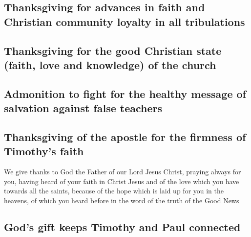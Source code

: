 \hypertarget{thanksgiving-for-advances-in-faith-and-christian-community-loyalty-in-all-tribulations}{%
\subsection{Thanksgiving for advances in faith and Christian community
loyalty in all
tribulations}\label{thanksgiving-for-advances-in-faith-and-christian-community-loyalty-in-all-tribulations}}

\hypertarget{thanksgiving-for-the-good-christian-state-faith-love-and-knowledge-of-the-church}{%
\subsection{Thanksgiving for the good Christian state (faith, love and
knowledge) of the
church}\label{thanksgiving-for-the-good-christian-state-faith-love-and-knowledge-of-the-church}}

\hypertarget{admonition-to-fight-for-the-healthy-message-of-salvation-against-false-teachers}{%
\subsection{Admonition to fight for the healthy message of salvation
against false
teachers}\label{admonition-to-fight-for-the-healthy-message-of-salvation-against-false-teachers}}

\hypertarget{thanksgiving-of-the-apostle-for-the-firmness-of-timothys-faith}{%
\subsection{Thanksgiving of the apostle for the firmness of Timothy's
faith}\label{thanksgiving-of-the-apostle-for-the-firmness-of-timothys-faith}}

 We give thanks to God the Father of our Lord Jesus
Christ, praying always for you,  having heard of your
faith in Christ Jesus and of the love which you have towards all the
saints,  because of the hope which is laid up for you in
the heavens, of which you heard before in the word of the truth of the
Good News

\hypertarget{gods-gift-keeps-timothy-and-paul-connected}{%
\subsection{God's gift keeps Timothy and Paul
connected}\label{gods-gift-keeps-timothy-and-paul-connected}}

